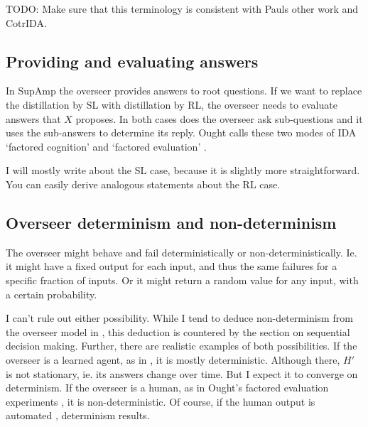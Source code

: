 \documentclass{farlamp}
\begin{document}
TODO: Make sure that this terminology is consistent with Pauls other work and
CotrIDA.





\subsection{Providing and evaluating answers}

In SupAmp \parencite{CSASupAmp} the overseer provides answers to root questions.
If we want to replace the distillation by SL with distillation by RL, the
overseer needs to evaluate answers that $X$ proposes. In both cases does the
overseer ask sub-questions and it uses the sub-answers to determine its reply.
Ought calls these two modes of IDA \parencite[see][]{CotrIDA} ‘factored
cognition’ \parencite{StuhFacCog} and ‘factored evaluation’
\parencite{StuhDelCog}.

I will mostly write about the SL case, because it is slightly more
straightforward. You can easily derive analogous statements about the RL case.


\subsection{Overseer determinism and non-determinism}

The overseer might behave and fail deterministically or non-deterministically.
Ie. it might have a fixed output for each input, and thus the same failures for
a specific fraction of inputs. Or it might return a random value for any input,
with a certain probability.

I can't rule out either possibility. While I tend to deduce non-determinism from
the overseer model in \textcite{ChriRelAmp}, this deduction is countered by the
section on sequential decision making. Further, there are realistic examples of
both possibilities. If the overseer is a learned agent, as in
\textcite{CSASupAmp}, it is mostly deterministic. Although there, $H'$ is not
stationary, ie. its answers change over time. But I expect it to converge on
determinism. If the overseer is a human, as in Ought's factored evaluation
experiments \parencite{StuhDelCog}, it is non-deterministic. Of course, if the
human output is automated \parencite[see][sec. ‘Caching’ f.]{StuhTaxCapAmp},
determinism results.
\end{document}
